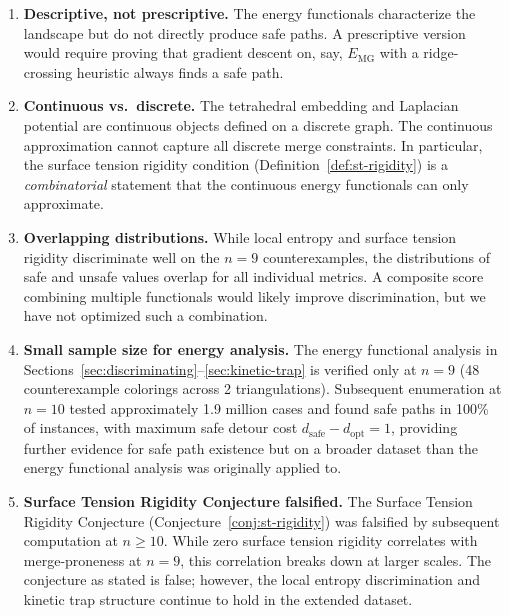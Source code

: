 \begin{enumerate}
  \item \textbf{Descriptive, not prescriptive.} The energy functionals
    characterize the landscape but do not directly produce safe paths.
    A prescriptive version would require proving that gradient descent
    on, say, $E_{\mathrm{MG}}$ with a ridge-crossing heuristic always
    finds a safe path.

  \item \textbf{Continuous vs.\ discrete.} The tetrahedral embedding
    and Laplacian potential are continuous objects defined on a discrete
    graph. The continuous approximation cannot capture all discrete
    merge constraints. In particular, the surface tension rigidity
    condition (Definition~\ref{def:st-rigidity}) is a
    \emph{combinatorial} statement that the continuous energy
    functionals can only approximate.

  \item \textbf{Overlapping distributions.} While local entropy and
    surface tension rigidity discriminate well on the $n = 9$
    counterexamples, the distributions of safe and unsafe values
    overlap for all individual metrics. A composite score combining
    multiple functionals would likely improve discrimination, but we
    have not optimized such a combination.

  \item \textbf{Small sample size for energy analysis.} The energy
    functional analysis in
    Sections~\ref{sec:discriminating}--\ref{sec:kinetic-trap} is
    verified only at $n = 9$ (48 counterexample colorings across 2
    triangulations). Subsequent enumeration at $n = 10$ tested
    approximately 1.9 million cases and found safe paths in 100\% of
    instances, with maximum safe detour cost
    $d_{\text{safe}} - d_{\text{opt}} = 1$, providing further evidence
    for safe path existence but on a broader dataset than the energy
    functional analysis was originally applied to.

  \item \textbf{Surface Tension Rigidity Conjecture falsified.}
    The Surface Tension Rigidity Conjecture
    (Conjecture~\ref{conj:st-rigidity}) was falsified by subsequent
    computation at $n \geq 10$. While zero surface tension rigidity
    correlates with merge-proneness at $n = 9$, this correlation breaks
    down at larger scales. The conjecture as stated is false; however,
    the local entropy discrimination and kinetic trap structure continue
    to hold in the extended dataset.
\end{enumerate}
